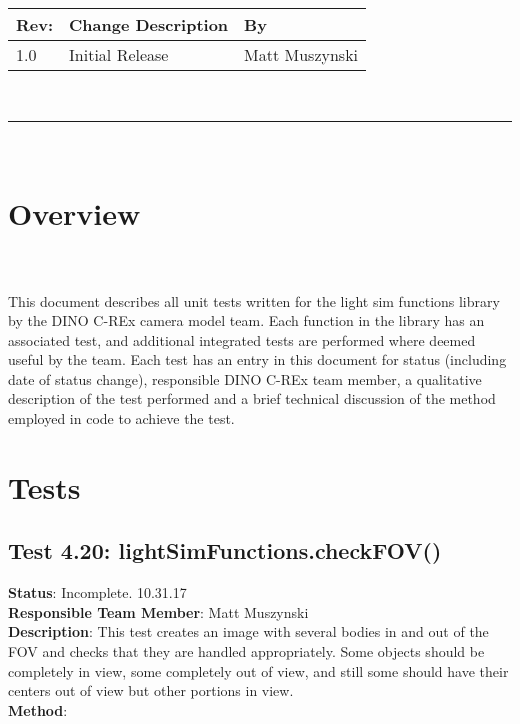 \documentclass[]{DINOReportMemo}
\begin{document}
\makeCover


%
%
\pagestyle{empty}
{\renewcommand{\arraystretch}{2}
\noindent
\begin{longtable}{|p{0.5in}|p{4.5in}|p{1.14in}|}
\hline
{\bfseries Rev}: & {\bfseries Change Description} & {\bfseries By} \\
\hline
1.0 & Initial Release & Matt Muszynski \\ %
\hline

\end{longtable}
}

\newpage
\setcounter{page}{1}
\pagestyle{fancy}

\tableofcontents
~\\ \hrule ~\\

\newpage
\section{Overview}\\\\
This document describes all unit tests written for the light sim functions library by the DINO C-REx camera model team. Each function in the library has an associated test, and additional integrated tests are performed where deemed useful by the team. Each test has an entry in this document for status (including date of status change), responsible DINO C-REx team member, a qualitative description of the test performed and a brief technical discussion of the method employed in code to achieve the test.

\section{Tests}
\subsection{Test 4.20: lightSimFunctions.checkFOV()}
\textbf{Status}: Incomplete. 10.31.17\\
\textbf{Responsible Team Member}: Matt Muszynski \\
\textbf{Description}: This test creates an image with several bodies in and out of the FOV and checks that they are handled appropriately. Some objects should be completely in view, some completely out of view, and still some should have their centers out of view but other portions in view.\\
\textbf{Method}: \\
\end{document}
